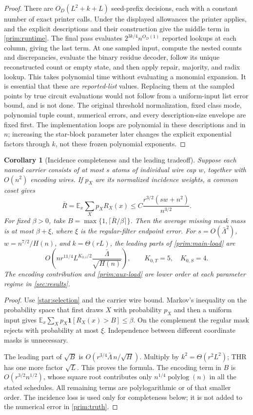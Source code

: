 \documentclass[11pt,letterpaper]{article}
\newtheorem{corollary}[theorem]{Corollary}
\theoremstyle{definition}
\theoremstyle{remark}
\newcommand{\E}{\mathbb E}
\newcommand{\polylog}{\operatorname{polylog}}
\newcommand{\ind}{\mathbf 1}
\begin{document}
\begin{proof}
There are $O_D(L^2+k+L)$ seed-prefix decisions, each with a constant
number of exact printer calls. Under the displayed allowances the
printer applies, and the explicit descriptions and their construction
give the middle term in \cref{prim:runtime}. The final pass evaluates
$2^{3k/4}n^{O_D(1)}$ reported lookups at each column, giving the last
term. At one sampled input, compute the nested counts and discrepancies,
evaluate the binary residue decoder, follow its unique reconstructed
count or empty state, and then apply repair, majority, and radix lookup.
This takes polynomial time without evaluating a monomial expansion.
It is essential that these are \emph{reported-list} values.
Replacing them at the sampled points by true circuit evaluations would
not follow from a uniform-input list error bound, and is not done.
The original threshold normalization, fixed class mode, polynomial
tuple count, numerical errors, and every description-size envelope are
fixed first. The implementation loops are polynomial in these
descriptions and in $n$; increasing the star-block parameter later
changes the explicit exponential factors through $k$, not these frozen
polynomial exponents.
\end{proof}

\begin{corollary}[Incidence completeness and the leading tradeoff]
\label{prim:ledger}
Suppose each named carrier consists of at most $s$ atoms of individual
wire cap $w$, together with $O(n^2)$ encoding wires. If $p_X$ are its
normalized incidence weights, a common coset gives
\[
\bar R=\E_x\sum_Xp_X R_X(x)
\le C\frac{r^{3/2}(s w+n^2)}{n^{3/2}}.
\]
For fixed $\beta>0$, take $B=\max\{1,\lceil\bar R/\beta\rceil\}$.
Then the average missing mask mass is at most $\beta+\xi$, where
$\xi$ is the regular-filter endpoint error. For
$s=O(\bar\Lambda^2)$, $w=n^{7/2}/H(n)$, and
$k=\Theta(rL)$, the leading parts of \cref{prim:main-load} are
\[
O\!\left(n r^{11/4}L^{K_{0,i}/2}
             \frac{\bar\Lambda}{\sqrt{H(n)}}\right),
\qquad K_{0,T}=5,\quad K_{0,S}=4.
\]
The encoding contribution and \cref{prim:aux-load} are lower order at
each parameter regime in \cref{sec:results}.
\end{corollary}
\begin{proof}
Use \cref{star:selection} and the carrier wire bound. Markov's inequality
on the probability space that first draws $X$ with probability $p_X$
and then a uniform input gives
$\E_x\sum_Xp_X\ind[R_X(x)>B]\le\beta$.
On the complement the regular mask rejects with probability at most
$\xi$. Independence between different coordinate masks is unnecessary.

The leading part of $\sqrt B$ is
$O(r^{3/4}\bar\Lambda\,n/\sqrt H)$.
Multiply by $k^2=\Theta(r^2L^2)$; THR has one more factor $\sqrt L$.
This proves the formula. The encoding term in $B$ is
$O(r^{3/2}n^{1/2})$, whose square root contributes only
$n^{1/4}\polylog(n)$ in all the stated schedules. All remaining
terms are polylogarithmic or of that smaller order. The incidence
loss is used only for completeness below; it is not added to the
numerical error in \cref{prim:truth}.
\end{proof}
\end{document}
